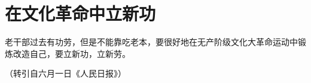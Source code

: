 \section[在文化革命中立新功（一九六七年六月）]{在文化革命中立新功}


老干部过去有功劳，但是不能靠吃老本，要很好地在无产阶级文化大革命运动中锻炼改造自己，要立新功，立新劳。

{\raggedleft （转引自六月一日《人民日报》）\par}


